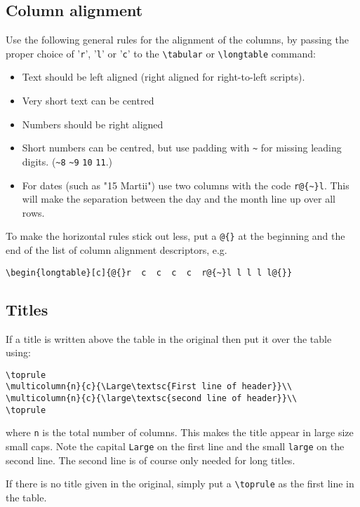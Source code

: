 \documentclass{report}
\begin{document}
\subsection{Column alignment}
Use the following general rules for the alignment of the columns,
by passing the proper choice of '\verb+r+', '\verb+l+' or '\verb+c+'
 to the \verb+\tabular+ or \verb+\longtable+ command:
\begin{itemize}
\item Text should be left aligned (right aligned for right-to-left scripts).
\item Very short text can be centred
\item Numbers should be right aligned
\item Short numbers can be centred, but use padding with \verb+~+ for missing
leading digits. (\verb+~8+ \verb+~9+ \verb+10+ \verb+11+.)
\item For dates (such as "15 Martii") use two columns with the code
\verb+r@{~}l+.
This will make the separation between the day and the month line up
over all rows.
\end{itemize}

To make the horizontal rules stick out less, put a \verb+@{}+ at the beginning
and the end of the list of column alignment descriptors, e.g.
\begin{verbatim}
\begin{longtable}[c]{@{}r  c  c  c  c  r@{~}l l l l l@{}}
\end{verbatim}

\subsection{Titles}
If a title is written above the table in the original then put it over the
table using:
\begin{verbatim}
\toprule
\multicolumn{n}{c}{\Large\textsc{First line of header}}\\
\multicolumn{n}{c}{\large\textsc{second line of header}}\\
\toprule
\end{verbatim}
where \verb+n+ is the total number of columns.
This makes the title appear in large size small caps.
Note the capital \verb+Large+
on the first line and the small \verb+large+ on the second line.
The second line is of course only needed for long titles.

If there is no title given in the original, simply put a \verb+\toprule+
as the first line in the table.
\end{document}
